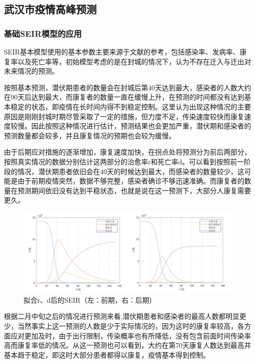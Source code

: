 \documentclass[12pt,hyperref,]{ctexart}
\begin{document}
\hypertarget{ux6b66ux6c49ux5e02ux75abux60c5ux9ad8ux5cf0ux9884ux6d4b}{%
\subsection{武汉市疫情高峰预测}\label{ux6b66ux6c49ux5e02ux75abux60c5ux9ad8ux5cf0ux9884ux6d4b}}

\hypertarget{ux57faux7840seirux6a21ux578bux7684ux5e94ux7528}{%
\subsubsection{基础SEIR模型的应用}\label{ux57faux7840seirux6a21ux578bux7684ux5e94ux7528}}

SEIR基本模型使用的基本参数主要来源于文献的参考，包括感染率、发病率、康复率以及死亡率等，初始模型考虑的是在封城的情况下，认为不存在迁入与迁出对未来情况的预测。

按照基本预测，潜伏期患者的数量会在封城后第40天达到最大，感染者的人数大约在90天后达到最大，而康复者的数量一直在缓慢上升，在预测的时间都没有达到基本稳定的状态，即疫情在长时间内得不到稳定控制。这里认为出现这种情况的主要原因是刚刚封城时期尽管采取了一定的措施，但力度不足，传染速度较快而康复速度较慢。因此按照这种情况进行估计，预测结果也会更加严重，潜伏期和感染者的预测数量都会较多，并且康复情况的预期也会较为缓慢。

由于后期应对措施的逐渐增加，康复速度加快，在拐点处将预测分为前后两部分，按照真实情况的数据分别估计这两部分的治愈率r和死亡率d。可以看到按照前一阶段的情况，潜伏期患者依旧会在40天的时候达到最大，而感染者的数量较少，这可能是由于前期疫情突然，数据不够完整，感染者确诊不够迅速准确。而康复者的数量在预测期间依旧没有达到平稳状态，也就是说在这一预测下，大部分人康复需要更久。

\begin{figure}
\includegraphics[width=5.56in]{image/4.2.1} \caption{拟合r、d后的SEIR（左：前期，右：后期）}\label{fig:1}
\end{figure}

根据二月中旬之后的情况进行预测来看,潜伏期患者和感染者的最高人数都明显更少，当然事实上这一预测的人数是少于实际情况的，因为这时的康复率较高，各方面应对更加及时，由于出行限制，传染概率也有所降低，没有包含前面时间传染率高而康复率低的情况。从这一预测也可以看到，大约在第70天康复人数达到最高并基本趋于稳定，即这时大部分患者都得以康复，疫情基本得到控制。
\end{document}
